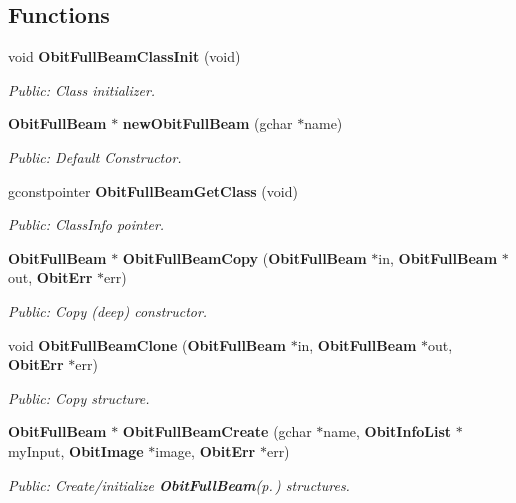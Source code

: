 \subsection*{Functions}
\begin{CompactItemize}
\item 
void {\bf Obit\-Full\-Beam\-Class\-Init} (void)
\begin{CompactList}\small\item\em Public: Class initializer. \item\end{CompactList}\item 
{\bf Obit\-Full\-Beam} $\ast$ {\bf new\-Obit\-Full\-Beam} (gchar $\ast$name)
\begin{CompactList}\small\item\em Public: Default Constructor. \item\end{CompactList}\item 
gconstpointer {\bf Obit\-Full\-Beam\-Get\-Class} (void)
\begin{CompactList}\small\item\em Public: Class\-Info pointer. \item\end{CompactList}\item 
{\bf Obit\-Full\-Beam} $\ast$ {\bf Obit\-Full\-Beam\-Copy} ({\bf Obit\-Full\-Beam} $\ast$in, {\bf Obit\-Full\-Beam} $\ast$out, {\bf Obit\-Err} $\ast$err)
\begin{CompactList}\small\item\em Public: Copy (deep) constructor. \item\end{CompactList}\item 
void {\bf Obit\-Full\-Beam\-Clone} ({\bf Obit\-Full\-Beam} $\ast$in, {\bf Obit\-Full\-Beam} $\ast$out, {\bf Obit\-Err} $\ast$err)
\begin{CompactList}\small\item\em Public: Copy structure. \item\end{CompactList}\item 
{\bf Obit\-Full\-Beam} $\ast$ {\bf Obit\-Full\-Beam\-Create} (gchar $\ast$name, {\bf Obit\-Info\-List} $\ast$my\-Input, {\bf Obit\-Image} $\ast$image, {\bf Obit\-Err} $\ast$err)
\begin{CompactList}\small\item\em Public: Create/initialize {\bf Obit\-Full\-Beam}{\rm (p.\,\pageref{structObitFullBeam})} structures. \item\end{CompactList}\item 

\end{CompactItemize}
